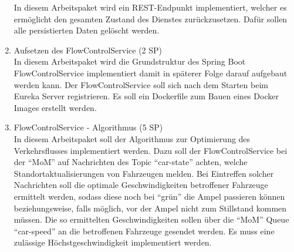\begin{enumerate}
 		In diesem Arbeitspaket wird ein REST-Endpunkt implementiert, welcher es ermöglicht den gesamten Zustand des Dienstes zurückzusetzen.
 		Dafür sollen alle persistierten Daten gelöscht werden.
  \item Aufsetzen des FlowControlService (2 SP)\\
  		In diesem Arbeitspaket wird die Grundstruktur des Spring Boot FlowControlService implementiert damit in späterer Folge darauf aufgebaut werden kann.
  		Der FlowControlService soll sich nach dem Starten beim Eureka Server registrieren.
  		Es soll ein Dockerfile zum Bauen eines Docker Images erstellt werden.
  \item FlowControlService - Algorithmus (5 SP)\\
  		In diesem Arbeitspaket soll der Algorithmus zur Optimierung des Verkehrsflusses implementiert werden.
  		Dazu soll der FlowControlService bei der \enquote{MoM} auf Nachrichten des Topic \enquote{car-state} achten, welche Standortaktualisierungen von Fahrzeugen melden.
  		Bei Eintreffen solcher Nachrichten soll die optimale Geschwindigkeiten betroffener Fahrzeuge ermittelt werden, sodass diese noch bei \enquote{grün} die Ampel passieren können beziehungsweise, falls möglich, vor der Ampel nicht zum Stillstand kommen müssen.
  		Die so ermittelten Geschwindigkeiten sollen über die \enquote{MoM} Queue \enquote{car-speed} an die betroffenen Fahrzeuge gesendet werden.
  		Es muss eine zulässige Höchstgeschwindigkeit implementiert werden.
\end{enumerate}

